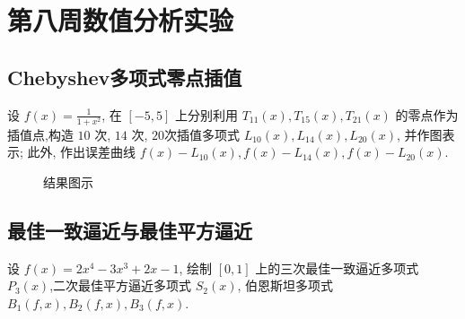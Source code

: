 \section{第八周数值分析实验}
\subsection{Chebyshev多项式零点插值}
\begin{ex}
	设 $f(x)=\frac{1}{1+x^2}$, 在 $[-5,5]$ 上分别利用 $T_{11}(x), T_{15}(x), T_{21}(x)$ 的零点作为插值点,构造 $10$ 次, $14$ 次, $20 $次插值多项式 $L_{10}(x), L_{14}(x), L_{20}(x)$, 并作图表示; 此外, 作出误差曲线 $f(x)-L_{10}(x), f(x)-L_{14}(x), f(x)-L_{20}(x)$.
\end{ex}

\begin{figure}[H]
	\centering
	\hfill
	\caption{结果图示}
\end{figure}
\subsection{最佳一致逼近与最佳平方逼近}
\begin{ex}
	设 $f(x)=2 x^4-3 x^3+2 x-1$, 绘制 $[0,1]$ 上的三次最佳一致逼近多项式 $P_3(x)$,二次最佳平方逼近多项式 $S_2(x)$, 伯恩斯坦多项式 $B_1(f, x), B_2(f, x), B_3(f, x)$.
\end{ex}
